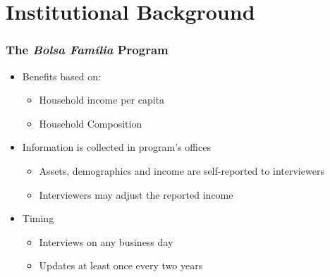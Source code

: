 \documentclass[xcolor=pdftex,dvipsnames,table]{beamer}
\begin{document}
\section{Institutional Background}

\begin{frame}
	\frametitle{The \textit{Bolsa Fam\'ilia} Program}
\begin{itemize}
\item Benefits based on: 
\begin{itemize}
\item Household income per capita
\item Household Composition
\end{itemize}
\item Information is collected in program's offices
\begin{itemize}
\item Assets, demographics and income are self-reported to interviewers
\item Interviewers may adjust the reported income
\end{itemize}
\item Timing
\begin{itemize}
\item Interviews on any business day
\item Updates at least once every two years
\end{itemize}
\end{itemize}	
\end{frame}
\end{document}
